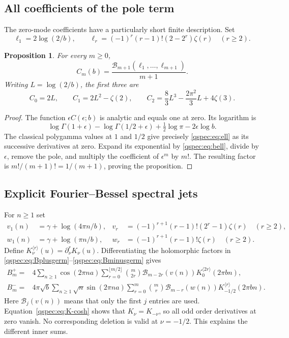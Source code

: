 \documentclass[11pt,letterpaper]{article}
\numberwithin{equation}{section}
\newtheorem{proposition}[theorem]{Proposition}
\theoremstyle{definition}
\newcommand{\Bcal}{\mathcal B}
\begin{document}
\subsection{All coefficients of the pole term}
The zero-mode coefficients have a particularly short finite description.
Set
\begin{equation}\label{qspec:eq:ell}
\ell_1=2\log(2/b),\qquad
\ell_r=(-1)^r(r-1)!(2-2^r)\zeta(r)\quad(r\ge2).
\end{equation}
\begin{proposition}\label{qspec:prop:pole-bell}
For every $m\ge0$,
\begin{equation}\label{qspec:eq:Cbell}
C_m(b)=\frac{\Bcal_{m+1}(\ell_1,\ldots,\ell_{m+1})}{m+1}.
\end{equation}
Writing $L=\log(2/b)$, the first three are
\begin{equation}\label{qspec:eq:Cexamples}
C_0=2L,\qquad C_1=2L^2-\zeta(2),\qquad
C_2=\frac83L^3-\frac{2\pi^2}{3}L+4\zeta(3).
\end{equation}
\end{proposition}
\begin{proof}
The function $\epsilon C(\epsilon;b)$ is analytic and equals one at zero.
Its logarithm is
\[
\log\Gamma(1+\epsilon)-\log\Gamma(1/2+\epsilon)
+\tfrac12\log\pi-2\epsilon\log b.
\]
The classical polygamma values at $1$ and $1/2$ \cite{gamma} give precisely
\eqref{qspec:eq:ell} as its successive derivatives at zero. Expand its
exponential by \eqref{qspec:eq:bell}, divide by $\epsilon$, remove the
pole, and multiply the coefficient of $\epsilon^m$ by $m!$. The resulting
factor is $m!/(m+1)!=1/(m+1)$, proving the proposition.
\end{proof}

\subsection{Explicit Fourier--Bessel spectral jets}
For $n\ge1$ set
\begin{align}
v_1(n)&=\gamma+\log(4\pi n/b),&
v_r&=(-1)^{r+1}(r-1)!(2^r-1)\zeta(r)\quad(r\ge2),\label{qspec:eq:vjets}\\
w_1(n)&=\gamma+\log(\pi n/b),&
w_r&=(-1)^{r+1}(r-1)!\zeta(r)\quad(r\ge2).\label{qspec:eq:wjets}
\end{align}
Define $K^{\langle r\rangle}_\nu(u)=\partial_\nu^rK_\nu(u)$.
Differentiating the holomorphic factors in
\eqref{qspec:eq:Bplusgerm}--\eqref{qspec:eq:Bminusgerm} gives
\begin{align}
B_m^+={}&4\sum_{n\ge1}\cos(2\pi na)
 \sum_{r=0}^{\lfloor m/2\rfloor}\binom{m}{2r}
 \Bcal_{m-2r}(v(n))K^{\langle2r\rangle}_0(2\pi bn),\label{qspec:eq:Bplusjets}\\
B_m^-={}&4\pi\sqrt b\sum_{n\ge1}\sqrt n\sin(2\pi na)
 \sum_{r=0}^m\binom mr\Bcal_{m-r}(w(n))
 K^{\langle r\rangle}_{-1/2}(2\pi bn).
\label{qspec:eq:Bminusjets}
\end{align}
Here $\Bcal_j(v(n))$ means that only the first $j$ entries are used.
Equation~\eqref{qspec:eq:K-cosh} shows that $K_\nu=K_{-\nu}$, so all
odd order derivatives at zero vanish. No corresponding deletion is valid
at $\nu=-1/2$. This explains the different inner sums.
\end{document}
